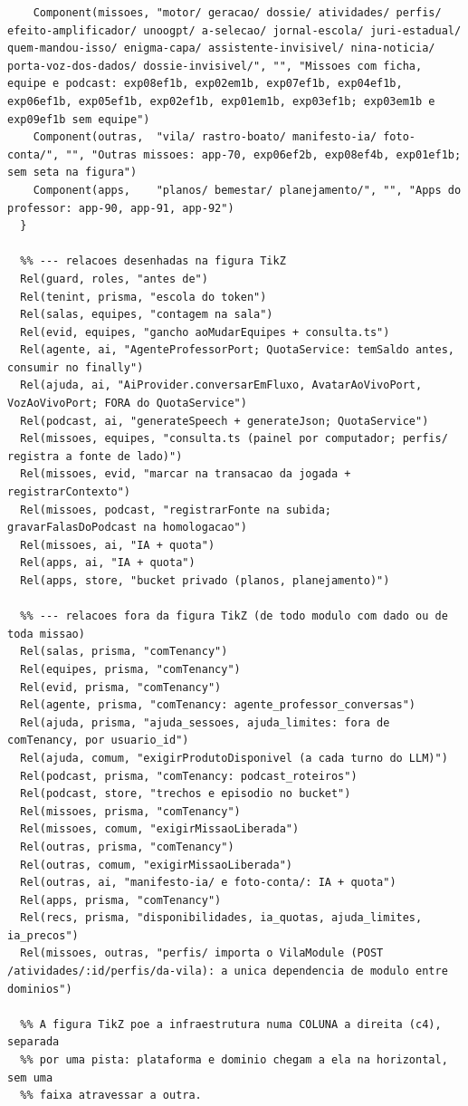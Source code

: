 \begin{lstlisting}[language=mermaid]
    %% --- dominio por experiencia
    Component(missoes, "motor/ geracao/ dossie/ atividades/ perfis/ efeito-amplificador/ unoogpt/ a-selecao/ jornal-escola/ juri-estadual/ quem-mandou-isso/ enigma-capa/ assistente-invisivel/ nina-noticia/ porta-voz-dos-dados/ dossie-invisivel/", "", "Missoes com ficha, equipe e podcast: exp08ef1b, exp02em1b, exp07ef1b, exp04ef1b, exp06ef1b, exp05ef1b, exp02ef1b, exp01em1b, exp03ef1b; exp03em1b e exp09ef1b sem equipe")
    Component(outras,  "vila/ rastro-boato/ manifesto-ia/ foto-conta/", "", "Outras missoes: app-70, exp06ef2b, exp08ef4b, exp01ef1b; sem seta na figura")
    Component(apps,    "planos/ bemestar/ planejamento/", "", "Apps do professor: app-90, app-91, app-92")
  }

  %% --- relacoes desenhadas na figura TikZ
  Rel(guard, roles, "antes de")
  Rel(tenint, prisma, "escola do token")
  Rel(salas, equipes, "contagem na sala")
  Rel(evid, equipes, "gancho aoMudarEquipes + consulta.ts")
  Rel(agente, ai, "AgenteProfessorPort; QuotaService: temSaldo antes, consumir no finally")
  Rel(ajuda, ai, "AiProvider.conversarEmFluxo, AvatarAoVivoPort, VozAoVivoPort; FORA do QuotaService")
  Rel(podcast, ai, "generateSpeech + generateJson; QuotaService")
  Rel(missoes, equipes, "consulta.ts (painel por computador; perfis/ registra a fonte de lado)")
  Rel(missoes, evid, "marcar na transacao da jogada + registrarContexto")
  Rel(missoes, podcast, "registrarFonte na subida; gravarFalasDoPodcast na homologacao")
  Rel(missoes, ai, "IA + quota")
  Rel(apps, ai, "IA + quota")
  Rel(apps, store, "bucket privado (planos, planejamento)")

  %% --- relacoes fora da figura TikZ (de todo modulo com dado ou de toda missao)
  Rel(salas, prisma, "comTenancy")
  Rel(equipes, prisma, "comTenancy")
  Rel(evid, prisma, "comTenancy")
  Rel(agente, prisma, "comTenancy: agente_professor_conversas")
  Rel(ajuda, prisma, "ajuda_sessoes, ajuda_limites: fora de comTenancy, por usuario_id")
  Rel(ajuda, comum, "exigirProdutoDisponivel (a cada turno do LLM)")
  Rel(podcast, prisma, "comTenancy: podcast_roteiros")
  Rel(podcast, store, "trechos e episodio no bucket")
  Rel(missoes, prisma, "comTenancy")
  Rel(missoes, comum, "exigirMissaoLiberada")
  Rel(outras, prisma, "comTenancy")
  Rel(outras, comum, "exigirMissaoLiberada")
  Rel(outras, ai, "manifesto-ia/ e foto-conta/: IA + quota")
  Rel(apps, prisma, "comTenancy")
  Rel(recs, prisma, "disponibilidades, ia_quotas, ajuda_limites, ia_precos")
  Rel(missoes, outras, "perfis/ importa o VilaModule (POST /atividades/:id/perfis/da-vila): a unica dependencia de modulo entre dominios")

  %% A figura TikZ poe a infraestrutura numa COLUNA a direita (c4), separada
  %% por uma pista: plataforma e dominio chegam a ela na horizontal, sem uma
  %% faixa atravessar a outra.
\end{lstlisting}

